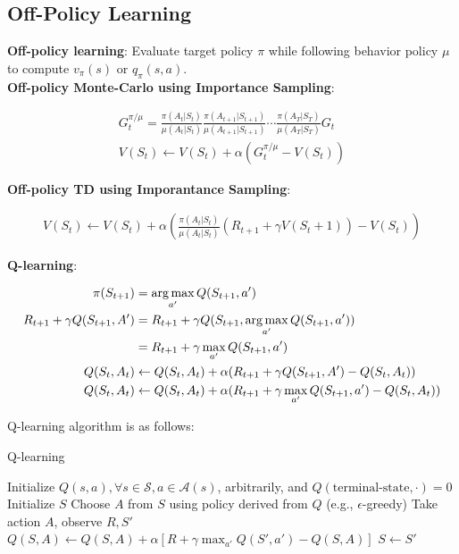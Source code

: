 \subsection{Off-Policy Learning}

\noindent \textbf{Off-policy learning}: Evaluate target policy $\pi$ while following behavior
policy $\mu$ to compute $v_\pi(s)$ or $q_\pi(s, a)$. \\

\noindent \textbf{Off-policy Monte-Carlo using Importance Sampling}:

\begin{gather*}
    G_t^{\pi / \mu} = \frac{\pi(A_t|S_t)}{\mu(A_t|S_t)} \frac{\pi(A_{t+1}|S_{t+1})}{\mu(A_{t+1}|S_{t+1})} \cdots \frac{\pi(A_{T}|S_{T})}{\mu(A_{T}|S_{T})} G_t \\
    V(S_t) \leftarrow V(S_t) + \alpha \left( G_t^{\pi / \mu} - V(S_t) \right)
\end{gather*}

\noindent \textbf{Off-policy TD using Imporantance Sampling}:

\begin{gather*}
    V(S_t) \leftarrow V(S_t) + \alpha \left( \frac{\pi(A_t|S_t)}{\mu(A_t|S_t)} (R_{t+1} + \gamma V(S_t+1)) - V(S_t) \right)
\end{gather*}

\noindent \textbf{Q-learning}:

\begin{align*}
    \pi(S_{t+1})                    & = \operatorname*{arg\,max}_{a'} Q(S_{t+1}, a')                                                             \\
    R_{t+1} + \gamma Q(S_{t+1}, A') & = R_{t+1} + \gamma Q(S_{t+1}, \operatorname*{arg\,max}_{a'} Q(S_{t+1}, a'))                                \\
                                    & = R_{t+1} + \gamma \max_{a'} Q(S_{t+1}, a')                                               \\
    Q(S_t, A_t)                     & \leftarrow Q(S_t, A_t) + \alpha (R_{t+1} + \gamma Q(S_{t+1}, A') - Q(S_t, A_t))           \\
    Q(S_t, A_t)                     & \leftarrow Q(S_t, A_t) + \alpha (R_{t+1} + \gamma \max_{a'} Q(S_{t+1}, a') - Q(S_t, A_t))
\end{align*}

\noindent Q-learning algorithm is as follows:

\begin{algorithm}[H]
    \caption{Q-learning}
    \begin{algorithmic}
        \State Initialize $Q(s, a), \forall s \in \mathcal{S}, a \in \mathcal{A}(s)$, arbitrarily, and $Q(\text{terminal-state}, \cdot) = 0$
        \State Initialize $S$
        \Repeat
        \State Choose $A$ from $S$ using policy derived from $Q$ (e.g., $\epsilon$-greedy)
        \State Take action $A$, observe $R, S'$
        \State $Q(S, A) \leftarrow Q(S, A) + \alpha[R + \gamma \max_{a'} Q(S', a') - Q(S, A)]$
        \State $S \leftarrow S'$
    \end{algorithmic}
\end{algorithm}
